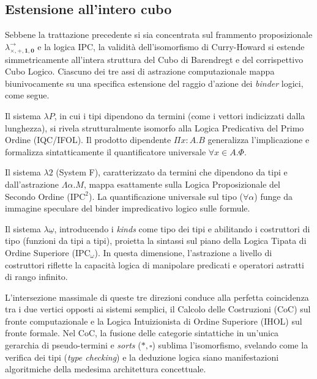 \subsection{Estensione all'intero cubo}
Sebbene la trattazione precedente si sia concentrata sul frammento proposizionale $\lambda^{\to}_{\times, +, \mathbf{1}, \mathbf{0}}$ e la logica IPC, la validità dell'isomorfismo 
di Curry-Howard si estende simmetricamente all'intera struttura del Cubo di Barendregt e del corrispettivo Cubo Logico. Ciascuno dei tre assi di astrazione computazionale mappa 
biunivocamente su una specifica estensione del raggio d'azione dei \emph{binder} logici, come segue.
\begin{description}[leftmargin=1.5em, style=nextline, font=\bfseries]
    \item[Asse $x$ (Tipi Dipendenti $\leftrightarrow$ Primo Ordine)] 
        Il sistema $\lambda P$, in cui i tipi dipendono da termini (come i vettori indicizzati dalla lunghezza), si rivela strutturalmente isomorfo alla Logica Predicativa del 
        Primo Ordine (IQC/IFOL). Il prodotto dipendente $\Pi x:A.B$ generalizza l'implicazione e formalizza sintatticamente il quantificatore universale $\forall x \in A. \Phi$.
    \item[Asse $y$ (Polimorfismo $\leftrightarrow$ Secondo Ordine)] 
        Il sistema $\lambda 2$ (System F), caratterizzato da termini che dipendono da tipi e dall'astrazione $\Lambda \alpha. M$, mappa esattamente sulla Logica Proposizionale 
        del Secondo Ordine ($\text{IPC}^2$). La quantificazione universale sul tipo ($\forall \alpha$) funge da immagine speculare del binder impredicativo logico sulle formule.
    \item[Asse $z$ (Operatori di Tipo $\leftrightarrow$ Ordine Superiore)] 
        Il sistema $\lambda\underline{\omega}$, introducendo i \emph{kinds} come tipo dei tipi e abilitando i costruttori di tipo (funzioni da tipi a tipi), proietta la sintassi 
        sul piano della Logica Tipata di Ordine Superiore ($\text{IPC}_\omega$). In questa dimensione, l'astrazione a livello di costruttori riflette la capacità logica di manipolare 
        predicati e operatori astratti di rango infinito.
\end{description}
L'intersezione massimale di queste tre direzioni conduce alla perfetta coincidenza tra i due vertici opposti ai sistemi semplici, il Calcolo delle Costruzioni (CoC) sul fronte 
computazionale e la Logica Intuizionista di Ordine Superiore (IHOL) sul fronte formale. Nel CoC, la fusione delle categorie sintattiche in un'unica gerarchia di pseudo-termini 
e \emph{sorts} ($\ast, \square$) sublima l'isomorfismo, svelando come la verifica dei tipi (\emph{type checking}) e la deduzione logica siano manifestazioni algoritmiche della 
medesima architettura concettuale.
